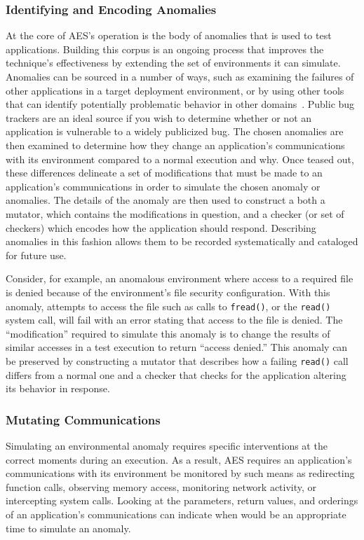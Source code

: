 \subsubsection{Identifying and Encoding Anomalies}
\label{SUBSUB:IdentifyingAndEncoding}
At the core of AES's operation is the body of anomalies that
is used to test applications.
Building this corpus is an ongoing process that improves the technique's
effectiveness by extending the set of environments it can simulate.
Anomalies can be sourced
in a number of ways,
such as
examining the failures of other applications
in a target deployment environment,
or by using other tools that can identify
potentially problematic behavior in other domains~\cite{Zhuang_NSDI_2014,
rasley2015detecting}.
Public bug trackers are an ideal source
if you wish to determine
whether or not an application
is vulnerable to a widely publicized bug.
The chosen anomalies are then examined
to determine how they change an application's communications
with its environment
compared to a normal execution and why.
Once teased out,
these differences delineate
a set of modifications
that must be made to an application's communications
in order to simulate the chosen anomaly or anomalies.
The details of the anomaly are then used to
construct a both a mutator,
which contains the modifications in question,
and a checker
(or set of checkers)
which encodes how the application should respond.
Describing anomalies in this fashion
allows them to be recorded systematically and cataloged for future use.

Consider,
for example,
an anomalous environment
where access to a required file is denied because of
the environment's file security configuration.
With this anomaly,
attempts to access the file
such as calls to {\tt fread()},
or the {\tt read()} system call,
will fail with an error stating that access to the file is denied.
The ``modification'' required to simulate this anomaly
is to change the results of similar accesses
in a test execution
to return ``access denied.''
This anomaly can be preserved by constructing a mutator that describes how
a failing {\tt read()} call differs from a normal one and a checker that checks for
the application altering its behavior in response.

\subsubsection{Mutating Communications}
\label{SUBSUB:MutatingCommunications}
Simulating an environmental anomaly requires specific interventions at the
correct moments during an execution.
As a result,
AES requires
an application's communications
with its environment
be monitored
by such means as
redirecting function calls,
observing memory access,
monitoring network activity,
or intercepting system calls.
Looking at the parameters,
return values,
and orderings
of an application's communications
can indicate
when would be an appropriate time to simulate an anomaly.


